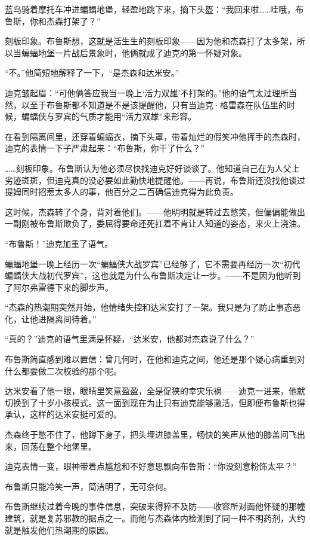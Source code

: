 \documentclass[../main]{subfiles}
\begin{document}
蓝鸟骑着摩托车冲进蝙蝠地堡，轻盈地跳下来，摘下头盔：“我回来啦……哇哦，布鲁斯，你和杰森打架了？”

刻板印象。布鲁斯想，这就是活生生的刻板印象——因为他和杰森打了太多架，所以当蝙蝠地堡一片战后景象时，他俩就成了迪克的第一怀疑对象。

“不。”他简短地解释了一下，“是杰森和达米安。”

迪克皱起眉：“可他俩答应我当一晚上`活力双雄'不打架的。”他的语气太过理所当然，以至于布鲁斯都不知道是不是该提醒他，只有当迪克·格雷森在队伍里的时候，蝙蝠侠与罗宾的气质才能用“活力双雄”来形容。

在看到隔离间里，还穿着蝙蝠衣，摘下头罩，带着灿烂的假笑冲他挥手的杰森时，迪克的表情一下子严肃起来：“布鲁斯，你干了什么？”

……刻板印象。布鲁斯认为他必须尽快找迪克好好谈谈了。他知道自己在为人父上劣迹斑斑，但迪克真的没必要如此勤快地提醒他。——再说，布鲁斯还没找他谈过提姆同时招惹太多人的事，他百分之二百确信迪克得为此负责。

这时候，杰森转了个身，背对着他们。——他明明就是转过去憋笑，但偏偏能做出一副刚被布鲁斯欺负了，委屈得要命还死扛着不肯让人知道的姿态，来火上浇油。

“布鲁斯！”迪克加重了语气。

蝙蝠地堡一晚上经历一次“蝙蝠侠大战罗宾”已经够了，它不需要再经历一次“初代蝙蝠侠大战初代罗宾”，这也就是为什么布鲁斯决定让一步。——不是因为他听到了阿尔弗雷德下来的脚步声。

“杰森的热潮期突然开始，他情绪失控和达米安打了一架。我只是为了防止事态恶化，让他进隔离间待着。”

“真的？”迪克的语气里满是怀疑，“达米安，他都对杰森说了什么？”

布鲁斯简直感到难以置信：曾几何时，在他和迪克之间，他还是那个疑心病重到对什么都要做二次校验的那个呢。

达米安看了他一眼，眼睛里笑意盈盈，全是促狭的幸灾乐祸——迪克一进来，他就切换到了十岁小孩模式。这一面到现在为止只有迪克能够激活，但即便布鲁斯也得承认，这样的达米安挺可爱的。

杰森终于憋不住了，他蹲下身子，把头埋进膝盖里，畅快的笑声从他的膝盖间飞出来，回荡在整个地堡里。

迪克表情一变，眼神带着点尴尬和不好意思飘向布鲁斯：“你没刻意粉饰太平？”

布鲁斯只能冷笑一声，简洁明了，无可奈何。

布鲁斯继续过着今晚的事件信息，突破来得猝不及防——收容所对面他怀疑的那幢建筑，就是复苏邪教的据点之一。而他与杰森体内检测到了同一种不明药剂，大约就是触发他们热潮期的原因。
\end{document}
